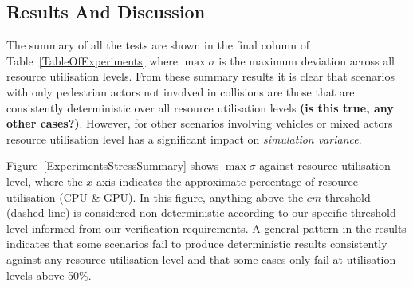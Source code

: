 \documentclass[letterpaper, 10 pt, journal, twoside]{IEEEtran}
\begin{document}

\subsection{Results And Discussion}\label{ResultsSection}
The summary of all the tests are shown in the final column of Table~\ref{TableOfExperiments} where $\max\sigma$ is the maximum deviation across all resource utilisation levels. From these summary results it is clear that scenarios with only pedestrian actors not involved in collisions are those that are consistently deterministic over all resource utilisation levels \textbf{(is this true, any other cases?)}. However, for other scenarios involving vehicles or mixed actors resource utilisation level has a significant impact on \textit{simulation variance}.

Figure~\ref{ExperimentsStressSummary} shows $\max\sigma$ against resource utilisation level, where the $x$-axis indicates the approximate percentage of resource utilisation (CPU \& GPU). In this figure, anything above the $cm$ threshold (dashed line) is considered non-deterministic according to our specific threshold level informed from our verification requirements. A general pattern in the results indicates that some scenarios fail to produce deterministic results consistently against any resource utilisation level and that some cases only fail at utilisation levels above 50\%.
\end{document}
